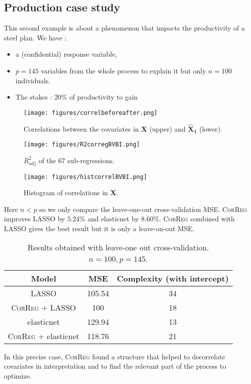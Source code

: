 \documentclass[11pt,a4paper]{article}
\begin{document}
		\subsection{Production case study}
This second example is about a phenomenon that impacts the productivity of a steel plan.
We have :
		\begin{itemize}
			\item a (confidential)  response variable,
			\item $p=145$ variables from the whole process to explain it but only $n=100$ individuals.
			\item The stakes : $20\%$ of productivity to gain
		\end{itemize}
		
\begin{figure}[h!]
	\begin{minipage}[l]{.30\linewidth}
			\texttt{[image: figures/correlbeforeafter.png]} 
			\caption{Correlations between the covariates in $\boldsymbol{X}$ (upper) and $\boldsymbol{\hat{X}_1}$ (lower).}
	\end{minipage} \hfill
	\begin{minipage}[c]{.30\linewidth}
			\texttt{[image: figures/R2corregBVBI.png]} 
			\caption{$R^2_{adj}$ of the 67 sub-regressions.}
	\end{minipage} \hfill
   \begin{minipage}[r]{.30\linewidth}
			\texttt{[image: figures/histcorrelBVBI.png]} 
			\caption{Histogram of correlations in $\boldsymbol{X}$.} 
   \end{minipage}
\end{figure}   			
	Here $n<p$ so we only compare the leave-one-out cross-validation MSE.
	\textsc{CorReg} improves LASSO by $5.24\%$ and elasticnet by $8.60\%$. \textsc{CorReg} combined with LASSO gives the best result but it is only a leave-on-out MSE.
\begin{table}[h!]
\centering
\begin{tabular}{|c|c|c|}
	\hline 
	Model & MSE & Complexity (with intercept) \\ 
	\hline 
	LASSO & 105.54 & 34 \\ 
	\hline 
	\textsc{CorReg} + LASSO & 100 & 18 \\ 
	\hline 
	elasticnet & 129.94 & 13 \\ 
	\hline 
	\textsc{CorReg} + elasticnet & 118.76 & 21 \\ 
	\hline 
\end{tabular} 
\caption{Results obtained with leave-one out cross-validation. $n=100, p=145$.}	
\end{table}
In this precise case, \textsc{CorReg} found a structure that helped to decorrelate covariates in interpretation and to find the relevant part of the process to optimize.
\end{document}
